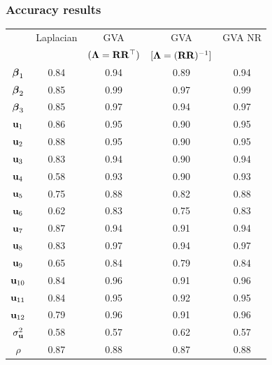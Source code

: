 \documentclass{beamer}
\begin{document}
\begin{frame}
	\frametitle{Accuracy results}
	\begin{tabular}{|c|cccc|}
		\hline
		               & Laplacian & GVA                       & GVA                         & GVA NR \\
		               &           & $({\boldsymbol \Lambda}={\bf R} {\bf R}^\top)$ & $[{\boldsymbol \Lambda}=({\bf R} {\bf R})^{-1}]$ &        \\
		\hline
		${\boldsymbol \beta}_1$     & 0.84      & 0.94                      & 0.89                        & 0.94   \\
		${\boldsymbol \beta}_2$     & 0.85      & 0.99                      & 0.97                        & 0.99   \\
		${\boldsymbol \beta}_3$     & 0.85      & 0.97                      & 0.94                        & 0.97   \\
		${\bf u}_1$        & 0.86      & 0.95                      & 0.90                        & 0.95   \\
		${\bf u}_2$        & 0.88      & 0.95                      & 0.90                        & 0.95   \\
		${\bf u}_3$        & 0.83      & 0.94                      & 0.90                        & 0.94   \\
		${\bf u}_4$        & 0.58      & 0.93                      & 0.90                        & 0.93   \\
		${\bf u}_5$        & 0.75      & 0.88                      & 0.82                        & 0.88   \\
		${\bf u}_6$        & 0.62      & 0.83                      & 0.75                        & 0.83   \\
		${\bf u}_7$        & 0.87      & 0.94                      & 0.91                        & 0.94   \\
		${\bf u}_8$        & 0.83      & 0.97                      & 0.94                        & 0.97   \\
		${\bf u}_9$        & 0.65      & 0.84                      & 0.79                        & 0.84   \\
		${\bf u}_{10}$     & 0.84      & 0.96                      & 0.91                        & 0.96   \\
		${\bf u}_{11}$     & 0.84      & 0.95                      & 0.92                        & 0.95   \\
		${\bf u}_{12}$     & 0.79      & 0.96                      & 0.91                        & 0.96   \\
		$\sigma_{\bf u}^2$ & 0.58      & 0.57                      & 0.62                        & 0.57   \\
		$\rho$         & 0.87      & 0.88                      & 0.87                        & 0.88   \\
		\hline
	\end{tabular}
\end{frame}
\end{document}
